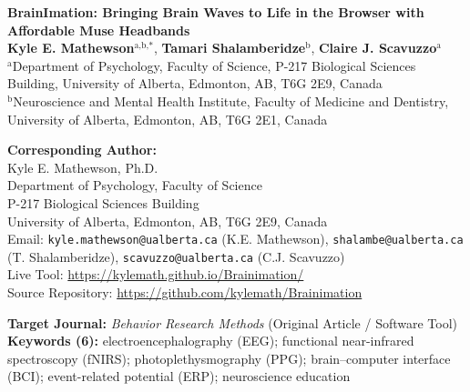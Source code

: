 \documentclass[11pt]{article}
\begin{document}
\begin{center}
{\LARGE \textbf{BrainImation: Bringing Brain Waves to Life in the Browser with Affordable Muse Headbands}}\\[16pt]

{\large \textbf{Kyle E. Mathewson}$^{\text{a,b,*}}$, \textbf{Tamari Shalamberidze}$^{\text{b}}$, \textbf{Claire J. Scavuzzo}$^{\text{a}}$}\\[10pt]
$^{\text{a}}$Department of Psychology, Faculty of Science, P-217 Biological Sciences Building, University of Alberta, Edmonton, AB, T6G 2E9, Canada\\
$^{\text{b}}$Neuroscience and Mental Health Institute, Faculty of Medicine and Dentistry, University of Alberta, Edmonton, AB, T6G 2E1, Canada\\[12pt]
\end{center}

\noindent\textbf{Corresponding Author:}\\
Kyle E. Mathewson, Ph.D.\\
Department of Psychology, Faculty of Science\\
P-217 Biological Sciences Building\\
University of Alberta, Edmonton, AB, T6G 2E9, Canada\\
Email: \texttt{kyle.mathewson@ualberta.ca} (K.E. Mathewson), \texttt{shalambe@ualberta.ca} (T. Shalamberidze), \texttt{scavuzzo@ualberta.ca} (C.J. Scavuzzo)\\
Live Tool: \url{https://kylemath.github.io/Brainimation/}\\
Source Repository: \url{https://github.com/kylemath/Brainimation}

\vspace{14pt}
\noindent\textbf{Target Journal:} \emph{Behavior Research Methods} (Original Article / Software Tool)\\[6pt]
\noindent\textbf{Keywords (6):} electroencephalography (EEG); functional near-infrared spectroscopy (fNIRS); photoplethysmography (PPG); brain--computer interface (BCI); event-related potential (ERP); neuroscience education

\vspace{14pt}
\end{document}
